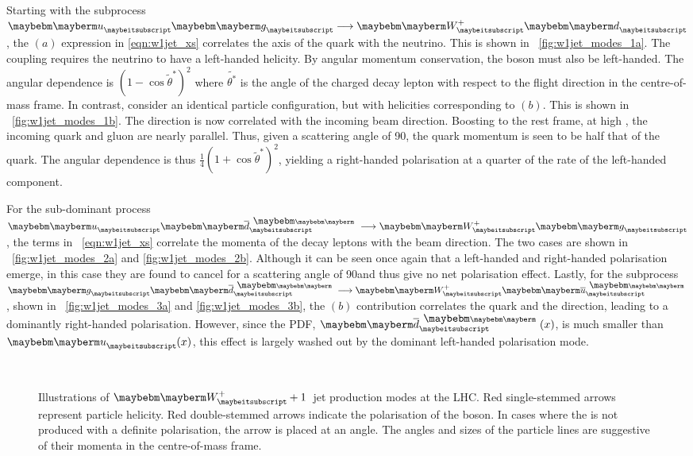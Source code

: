 Starting with the subprocess $\Pup\Pgluon\longrightarrow\PWp\Pdown$, the $(a)$
expression in \ref{eqn:w1jet_xs} correlates the axis of the \Pdown quark with
the neutrino. This is shown in \fig~\ref{fig:w1jet_modes_1a}. The \VminusA
coupling requires the neutrino to have a left-handed helicity. By angular
momentum conservation, the \PW boson must also be left-handed. The angular
dependence is $(1-\cos\tilde{\theta}^*)^2$ where $\tilde{\theta^*}$ is the angle
of the charged decay lepton with respect to the \PW flight direction in the
centre-of-mass frame. In contrast, consider an identical particle configuration,
but with helicities corresponding to $(b)$. This is shown in
\fig~\ref{fig:w1jet_modes_1b}. The \Ppositron direction is now correlated with
the incoming beam direction. Boosting to the \PW rest frame, at high \PtW, the
incoming quark and gluon are nearly parallel. Thus, given a scattering angle of
90\degrees, the \Pup quark momentum is seen to be half that of the \Pdown
quark. The angular dependence is thus $\frac{1}{4}(1+\cos\tilde{\theta}^*)^2$,
yielding a right-handed polarisation at a quarter of the rate of the left-handed
component.

For the sub-dominant process $\Pup\APdown\longrightarrow\PWp\Pgluon$, the terms
in \eqn~\ref{eqn:w1jet_xs} correlate the momenta of the decay leptons with the
beam direction. The two cases are shown in \figs~\ref{fig:w1jet_modes_2a} and
\ref{fig:w1jet_modes_2b}. Although it can be seen once again that a left-handed
and right-handed polarisation emerge, in this case they are found to cancel for
a scattering angle of 90\degrees and thus give no net polarisation
effect. Lastly, for the subprocess $\Pgluon\APdown\longrightarrow\PWp\APup$,
shown in \figs~\ref{fig:w1jet_modes_3a} and \ref{fig:w1jet_modes_3b}, the $(b)$
contribution correlates the \Pup quark and the \Ppositron direction, leading to
a dominantly right-handed polarisation. However, since the \ac{PDF},
$\APdown(x)$, is much smaller than $\Pup(x)$, this effect is largely washed out
by the dominant left-handed polarisation mode.

\begin{figure}[h!]
\centering
{}\quad
{}\quad
{}\\
\quad
{}\quad
{}
\caption{Illustrations of $\PWplus+1$~jet production modes at the LHC. Red
  single-stemmed arrows represent particle helicity. Red double-stemmed arrows
  indicate the polarisation of the \PW boson. In cases where the \PW is not
  produced with a definite polarisation, the arrow is placed at an angle. The
  angles and sizes of the particle lines are suggestive of their momenta in the
  centre-of-mass frame.}
\label{fig:w1jet_modes}
\end{figure}

